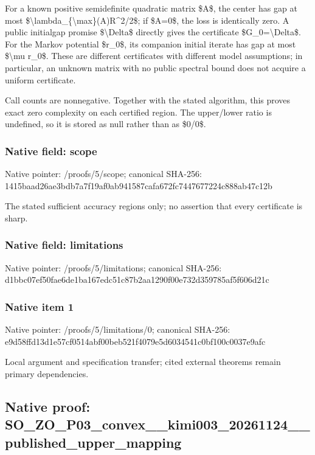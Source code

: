 \documentclass[10pt,a4paper]{article}
\begin{document}
For a known positive semidefinite quadratic matrix \$A\$, the center has gap at most \$\textbackslash{}lambda\_\{\textbackslash{}max\}(A)R\textasciicircum{}2/2\$; if \$A=0\$, the loss is identically zero. A public initialgap promise \$\textbackslash{}Delta\$ directly gives the certificate \$G\_0=\textbackslash{}Delta\$. For the Markov potential \$r\_0\$, its companion initial iterate has gap at most \$\textbackslash{}mu r\_0\$. These are different certificates with different model assumptions; in particular, an unknown matrix with no public spectral bound does not acquire a uniform certificate.

Call counts are nonnegative. Together with the stated algorithm, this proves exact zero complexity on each certified region. The upper/lower ratio is undefined, so it is stored as null rather than as \$0/0\$.


\subsubsection{Native field: scope}


Native pointer: /proofs/5/scope; canonical SHA-256: 1415baad26ae3bdb7a7f19af\allowbreak{}0ab941587cafa672fc744767\allowbreak{}7224c888ab47c12b


The stated sufficient accuracy regions only; no assertion that every certificate is sharp.


\subsubsection{Native field: limitations}


Native pointer: /proofs/5/limitations; canonical SHA-256: d1bbc07ef50fae6de1ba167e\allowbreak{}dc51c87b2aa1290f00e732d3\allowbreak{}59785af5f606d21c



\subsubsection{Native item 1}


Native pointer: /proofs/5/limitations/0; canonical SHA-256: e9d58ffd13d1e57cf0514abf\allowbreak{}00beb521f4079e5d6034541c\allowbreak{}0bf100c0037e9afc


Local argument and specification transfer; cited external theorems remain primary dependencies.


\subsection{Native proof: SO\_ZO\_P03\_convex\_\_kimi00\allowbreak{}3\_20261124\_\_published\_up\allowbreak{}per\_mapping}
\end{document}
